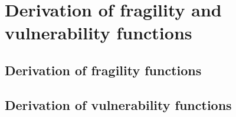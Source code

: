 	\section{Derivation of fragility and vulnerability functions}
	\label{sec:derive_fragility}
	

		\subsection{Derivation of fragility functions}
		\label{subsec:derive_fragility}
		

		\subsection{Derivation of vulnerability functions}
		\label{subsec:derive_vulnerability}
		